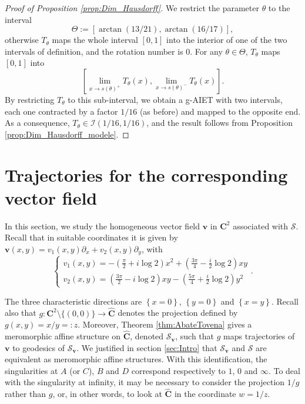 \documentclass[11pt]{article}
\begin{document}
\begin{proof}[Proof of Proposition \ref{prop:Dim_Hausdorff}]
We restrict the parameter $\theta$ to the interval 
\[
\Theta:=[\arctan(13/21),\arctan(16/17)],
\]
otherwise $T_{\theta}$ maps the whole interval $\left[0,1\right]$ into the interior of one of the two intervals of definition, and the rotation number is 0. For any $\theta\in\Theta$, $T_{\theta}$ maps $\left[0,1\right]$ into 
\[
\left[\lim_{x\rightarrow s(\theta)^{+}}T_{\theta}\left(x\right),\lim_{x\rightarrow s(\theta)^{-}}T_{\theta}\left(x\right)\right].
\]
By restricting $T_{\theta}$ to this sub-interval, we obtain a g-AIET with two intervals, each one contracted by a factor $1/16$ (as before) and mapped to the opposite end. As a consequence, $T_{\theta}\in\mathcal{I}\left(1/16,1/16\right)$, and the result follows from Proposition \ref{prop:Dim_Hausdorff_modele}.
\end{proof}

\section{Trajectories for the corresponding vector field}

\label{sec:Chp_vect}

In this section, we study the homogeneous vector field $\mathbf{v}$ in $\mathbf{C}^{2}$ associated with $\mathcal{S}$. Recall that in suitable coordinates it is given by $\mathbf{v}\left(x,y\right)=v_{1}\left(x,y\right)\partial_{x}+v_{2}\left(x,y\right)\partial_{y}$, with
\[
\left\{
\begin{array}{l}
\displaystyle v_{1}\left(x,y\right) = -\left(\frac{\pi}{2}+i\log2\right)x^{2}+\left(\frac{3\pi}{4}-\frac{i}{2}\log2\right)xy\\[3pt]
\displaystyle v_{2}\left(x,y\right) = \left(\frac{3\pi}{2}-i\log2\right)xy-\left(\frac{5\pi}{4}+\frac{i}{2}\log2\right)y^{2}
\end{array}
\right.
.
\]

The three characteristic directions are $\left\{x=0\right\}$, $\left\{y=0\right\}$ and $\left\{x=y\right\}$. Recall also that $g:\mathbf{C}^{2}\setminus\{(0,0)\}\rightarrow\widehat{\mathbf{C}}$ denotes the projection defined by $g\left(x,y\right)=x/y=:z$. Moreover, Theorem \ref{thm:AbateTovena} gives a meromorphic affine structure on $\widehat{\mathbf{C}}$, denoted $\mathcal{S}_{\mathbf{v}}$, such that $g$ maps trajectories of $\mathbf{v}$ to geodesics of $\mathcal{S}_{\mathbf{v}}$. We justified in section \ref{sec:Intro} that $\mathcal{S}_{\mathbf{v}}$ and $\mathcal{S}$ are equivalent as meromorphic affine structures. With this identification, the singularities at $A$ (or $C$), $B$ and $D$ correspond respectively to $1$, $0$ and $\infty$. To deal with the singularity at infinity, it may be necessary to consider the projection $1/g$ rather than $g$, or, in other words, to look at $\widehat{\mathbf{C}}$ in the coordinate $w=1/z$.
\end{document}
